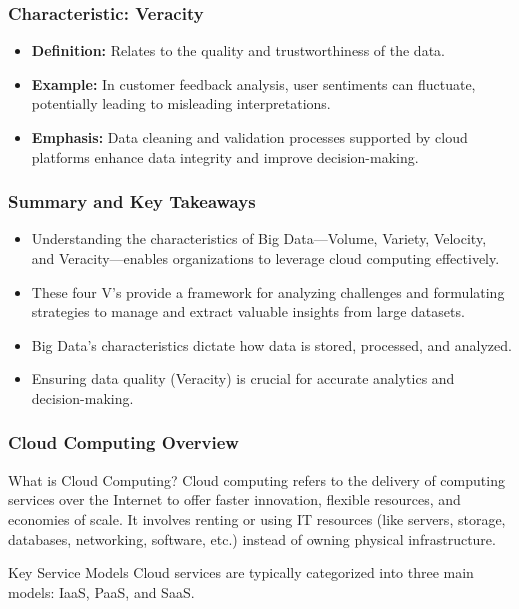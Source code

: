\documentclass[aspectratio=169]{beamer}
\begin{document}
\begin{frame}[fragile]
    \frametitle{Characteristic: Veracity}

    \begin{itemize}
        \item \textbf{Definition:} Relates to the quality and trustworthiness of the data.
        \item \textbf{Example:} In customer feedback analysis, user sentiments can fluctuate, 
        potentially leading to misleading interpretations.
        \item \textbf{Emphasis:} Data cleaning and validation processes supported by cloud platforms 
        enhance data integrity and improve decision-making.
    \end{itemize}
\end{frame}

\begin{frame}[fragile]
    \frametitle{Summary and Key Takeaways}

    \begin{itemize}
        \item Understanding the characteristics of Big Data—Volume, Variety, Velocity, and Veracity—enables organizations 
        to leverage cloud computing effectively.
        \item These four V's provide a framework for analyzing challenges and formulating strategies 
        to manage and extract valuable insights from large datasets.
        \item Big Data's characteristics dictate how data is stored, processed, and analyzed.
        \item Ensuring data quality (Veracity) is crucial for accurate analytics and decision-making.
    \end{itemize}
\end{frame}

\begin{frame}[fragile]
    \frametitle{Cloud Computing Overview}
    \begin{block}{What is Cloud Computing?}
        Cloud computing refers to the delivery of computing services over the Internet to offer faster innovation, flexible resources, and economies of scale. It involves renting or using IT resources (like servers, storage, databases, networking, software, etc.) instead of owning physical infrastructure.
    \end{block}
    
    \begin{block}{Key Service Models}
        Cloud services are typically categorized into three main models: IaaS, PaaS, and SaaS.
    \end{block}
\end{frame}
\end{document}
